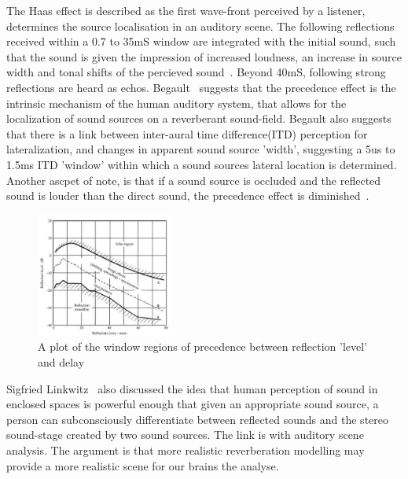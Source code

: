 \documentclass[paper=a4, fontsize=10pt, font=arial]{scrartcl} %
\numberwithin{equation}{section} %
\numberwithin{figure}{section} %
\numberwithin{table}{section} %
\begin{document}
The Haas effect is described as the first wave-front perceived by a listener, determines the source localisation in an auditory scene. The following reflections received within a 0.7 to 35mS window are integrated with the initial sound, such that the sound is given the impression of increased loudness, an increase in source width and tonal shifts of the percieved sound~\cite{Everest2009}. Beyond 40mS, following strong reflections are heard as echos. Begault~\cite{Begault1995} suggests that the precedence effect is the intrinsic mechanism  of the human auditory system, that allows for the localization of sound sources on a reverberant sound-field. Begault also suggests that there is a link between inter-aural time difference(ITD) perception for lateralization, and changes in apparent sound source 'width', suggesting a 5us to 1.5ms ITD 'window' within which a sound sources lateral location is determined. Another ascpet of note, is that if a sound source is occluded and the reflected sound is louder than the direct sound, the precedence effect is diminished~\cite{Wiggins2004}.

\begin{figure}[H]
\centering
\includegraphics[width=0.4\textwidth]{precedence.jpg}
\caption{A plot of the window regions of precedence between reflection 'level' and delay~\cite{Everest2009}}
\end{figure}

Sigfried Linkwitz~\cite{Linkwitz2015} also discussed the idea that human perception of sound in enclosed spaces is powerful enough that given an appropriate sound source, a person can subconsciously differentiate between reflected sounds and the stereo sound-stage created by two sound sources.  The link is with auditory scene analysis. The argument is that more realistic reverberation modelling may provide a more realistic scene for our brains the analyse. 
\end{document}
